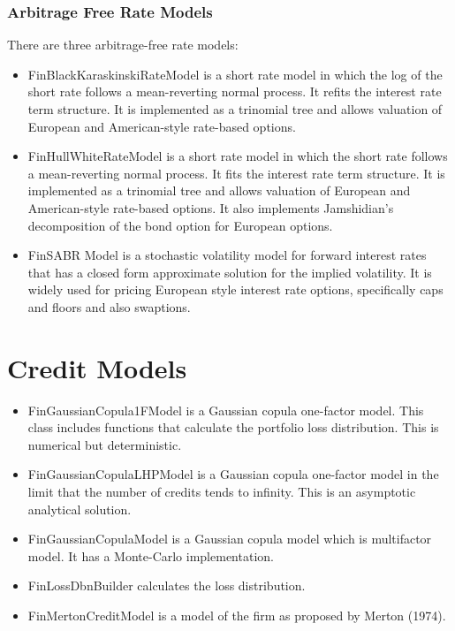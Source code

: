 \documentclass[twoside,11pt]{book}
\begin{document}
\subsubsection*{Arbitrage Free Rate Models}
There are three arbitrage-free rate models:
\begin{itemize}
\item{ FinBlackKaraskinskiRateModel is a short rate model in which the log of the short rate follows a mean-reverting normal process. It refits the interest rate term structure. It is implemented as a trinomial tree and allows valuation of European and American-style rate-based options.
}
\item{ FinHullWhiteRateModel is a short rate model in which the short rate follows a mean-reverting normal process. It fits the interest rate term structure. It is implemented as a trinomial tree and allows valuation of European and American-style rate-based options. It also implements Jamshidian's decomposition of the bond option for European options.
}
\item{ FinSABR Model is a stochastic volatility model for forward interest rates that has a closed form approximate solution for the implied volatility. It is widely used for pricing European style interest rate options, specifically caps and floors and also swaptions.
}
\end{itemize}


\section*{Credit Models}
\begin{itemize}
\item{ FinGaussianCopula1FModel is a Gaussian copula one-factor model. This class includes functions that calculate the portfolio loss distribution. This is numerical but deterministic.
}
\item{ FinGaussianCopulaLHPModel is a Gaussian copula one-factor model in the limit that the number of credits tends to infinity. This is an asymptotic analytical solution.
}
\item{ FinGaussianCopulaModel is a Gaussian copula model which is multifactor model. It has a Monte-Carlo implementation.
}
\item{ FinLossDbnBuilder calculates the loss distribution.
}
\item{ FinMertonCreditModel is a model of the firm as proposed by Merton (1974).
}
\end{itemize}
\end{document}
